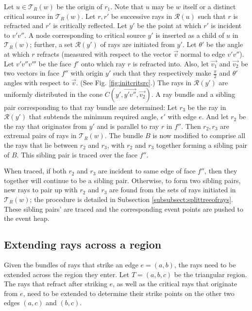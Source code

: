 \documentclass[11pt]{article}
\def\calT{\mathcal{T}}
\def\calR{\mathcal{R}}
\begin{document}
Let $u \in \calT_{R}(w)$ be the origin of $r_1$.
Note that $u$ may be $w$ itself or a distinct critical source in $\calT_{R}(w)$.
Let $r,r'$ be successive rays in $\calR(u)$ such that $r$ is refracted and $r'$ is critically reflected.
Let $y'$ be the point at which $r'$ is incident to $v'v''$.
A node corresponding to critical source $y'$ is inserted as a child of $u$ in $\calT_{R}(w)$; 
further, a set $\calR(y')$ of rays are initiated from $y'$. 
Let $\theta'$ be the angle at which $r$ refracts (measured with respect to the vector $\overrightarrow{v}$ normal to edge $v'v''$).
Let $v'v''v'''$ be the face $f'$ onto which ray $r$ is refracted into.
Also, let $\overrightarrow{v_1}$ and $\overrightarrow{v_2}$ be two vectors in face $f''$ with origin $y'$ such that they respectively make $\frac{\pi}{2}$ and $\theta'$ angles with respect to $\overrightarrow{v}$. 
(See Fig. \ref{fig:initcritsrc}.)
The rays in $\calR(y')$ are uniformly distributed in the cone $C(y', \overrightarrow{y'v''}, \overrightarrow{v_2})$.
A ray bundle and a sibling pair corresponding to that ray bundle are determined:
Let $r_3$ be the ray in $\calR(y')$ that subtends the minimum required angle, $\epsilon'$ with edge $e$.
And let $r_2$ be the ray that originates from $y'$ and is parallel to ray $r$ in $f''$. 
Then $r_2, r_3$ are extremal pairs of rays in $\calT_{R}(w)$.
The bundle $B$ is now modified to  comprise all the rays that lie between $r_2$ and $r_3$, with $r_2$ and $r_3$ together forming a sibling pair of $B$.
This sibling pair is traced over the face $f''$.

When traced, if both $r_2$ and $r_3$ are incident to same edge of face $f''$, then they together will continue to be a sibling pair.
Otherwise, to form two sibling pairs, new rays to pair up with $r_2$ and $r_3$ are found from the sets of rays initiated in $\calT_R(w)$; the procedure is detailed in Subsection \ref{subsubsect:splittreeofrays}.
These sibling pairs' are traced and the corresponding event points are pushed to the event heap.

\subsection{Extending rays  across a region}
\label{subsect:extendrays}

 Given the bundles of rays that strike an edge $e=(a,b)$, the rays need to be extended across the region they enter.
 Let $T=(a,b,c)$ be the triangular region. The rays that refract after striking $e$, as well as the critical rays that 
 originate from $e$, need to be extended to determine their strike points on the other two edges $(a,c)$ and $(b,c)$.
 
\end{document}
